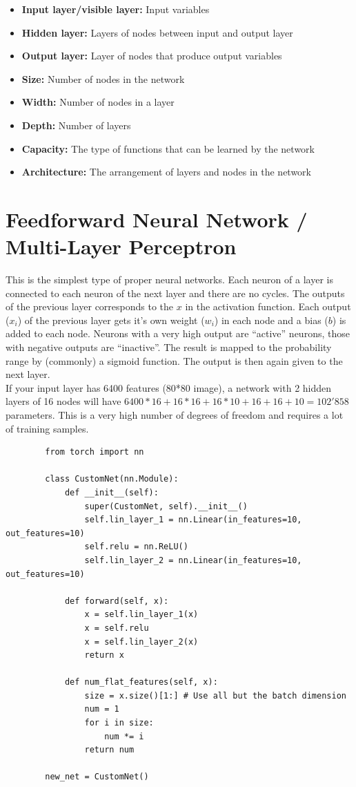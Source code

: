 \documentclass[
]{book}
\begin{document}
\begin{itemize}
\item
  \textbf{Input layer/visible layer:} Input variables
\item
  \textbf{Hidden layer:} Layers of nodes between input and output layer
\item
  \textbf{Output layer:} Layer of nodes that produce output variables
\item
  \textbf{Size:} Number of nodes in the network
\item
  \textbf{Width:} Number of nodes in a layer
\item
  \textbf{Depth:} Number of layers
\item
  \textbf{Capacity:} The type of functions that can be learned by the
  network
\item
  \textbf{Architecture:} The arrangement of layers and nodes in the network
\end{itemize}

\hypertarget{feedforward-neural-network-multi-layer-perceptron}{%
\section{Feedforward Neural Network / Multi-Layer Perceptron}\label{feedforward-neural-network-multi-layer-perceptron}}

This is the simplest type of proper neural networks. Each neuron of a
layer is connected to each neuron of the next layer and there are no
cycles. The outputs of the previous layer corresponds to the \(x\) in the
activation function. Each output (\(x_i\)) of the previous layer gets it's
own weight (\(w_i\)) in each node and a bias (\(b\)) is added to each node.
Neurons with a very high output are ``active'' neurons, those with
negative outputs are ``inactive''. The result is mapped to the probability
range by (commonly) a sigmoid function. The output is then again given
to the next layer.\\
If your input layer has 6400 features (80*80 image), a network with 2
hidden layers of 16 nodes will have
\(6400*16+16*16+16*10+16+16+10 = 102'858\) parameters. This is a very high
number of degrees of freedom and requires a lot of training samples.

\begin{verbatim}
        from torch import nn

        class CustomNet(nn.Module):
            def __init__(self):
                super(CustomNet, self).__init__()
                self.lin_layer_1 = nn.Linear(in_features=10, out_features=10)
                self.relu = nn.ReLU()
                self.lin_layer_2 = nn.Linear(in_features=10, out_features=10)

            def forward(self, x):
                x = self.lin_layer_1(x)
                x = self.relu
                x = self.lin_layer_2(x)
                return x

            def num_flat_features(self, x):
                size = x.size()[1:] # Use all but the batch dimension
                num = 1
                for i in size:
                    num *= i
                return num

        new_net = CustomNet()
\end{verbatim}
\end{document}
